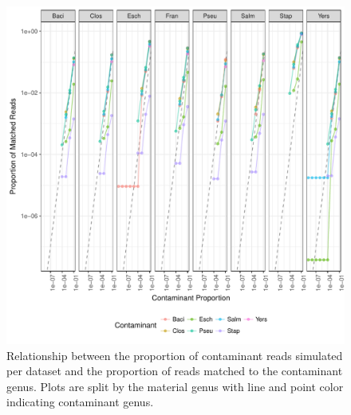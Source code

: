 \documentclass[fleqn,10pt,lineno]{wlpeerj}\usepackage[]{graphicx}\usepackage[]{color}
\makeatletter
\def\maxwidth{ %
  \ifdim\Gin@nat@width>\linewidth
    \linewidth
  \else
    \Gin@nat@width
  \fi
}
\newenvironment{knitrout}{}{} %
\makeatother
\begin{document}
\begin{knitrout}
\color{fgcolor}\begin{figure}
\includegraphics[width=\maxwidth]{figure/contam_fig-1} \caption[Relationship between the proportion of contaminant reads simulated per dataset and the proportion of reads matched to the contaminant genus]{Relationship between the proportion of contaminant reads simulated per dataset and the proportion of reads matched to the contaminant genus. Plots are split by the material genus with line and point color indicating contaminant genus.}\label{fig:contam_fig}
\end{figure}


\end{knitrout}

\end{document}
